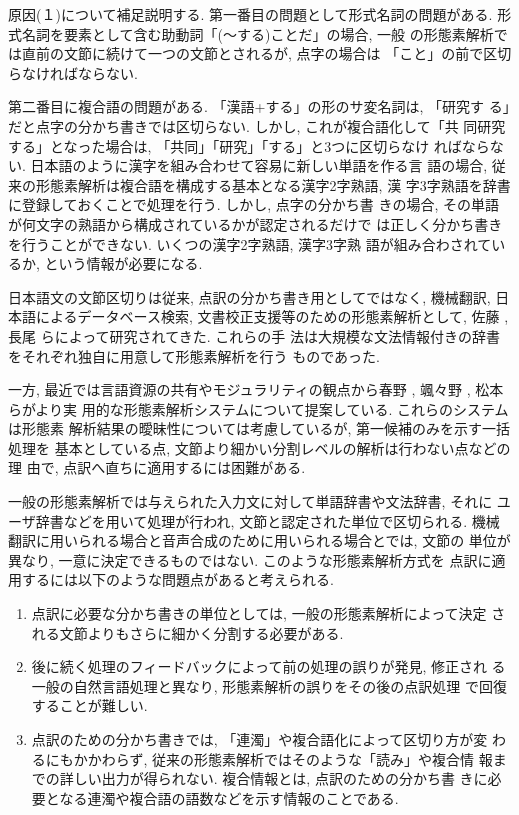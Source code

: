 原因(１)について補足説明する. 第一番目の問題として形式名詞の問題がある. 
形式名詞を要素として含む助動詞「(〜する)ことだ」の場合, 一般
 の形態素解析では直前の文節に続けて一つの文節とされるが, 点字の場合は
 「こと」の前で区切らなければならない. 

第二番目に複合語の問題がある. 「漢語+する」の形のサ変名詞は, 「研究す
る」だと点字の分かち書きでは区切らない. しかし, これが複合語化して「共
同研究する」となった場合は, 「共同」「研究」「する」と3つに区切らなけ
ればならない. 日本語のように漢字を組み合わせて容易に新しい単語を作る言
語の場合, 従来の形態素解析は複合語を構成する基本となる漢字2字熟語, 漢
字3字熟語を辞書に登録しておくことで処理を行う. しかし, 点字の分かち書
きの場合, その単語が何文字の熟語から構成されているかが認定されるだけで
は正しく分かち書きを行うことができない. いくつの漢字2字熟語, 漢字3字熟
語が組み合わされているか, という情報が必要になる. 

日本語文の文節区切りは従来, 点訳の分かち書き用としてではなく, 機械翻訳, 
日本語によるデータベース検索, 文書校正支援等のための形態素解析として, 
佐藤 \cite{satoh}, 長尾 \cite{nagao}らによって研究されてきた. これらの手
法は大規模な文法情報付きの辞書をそれぞれ独自に用意して形態素解析を行う
ものであった. 

一方, 最近では言語資源の共有やモジュラリティの観点から春野
\cite{haruno}, 颯々野 \cite{sassano}, 松本 \cite{matsumoto97}らがより実
用的な形態素解析システムについて提案している. これらのシステムは形態素
解析結果の曖昧性については考慮しているが, 第一候補のみを示す一括処理を
基本としている点, 文節より細かい分割レベルの解析は行わない点などの理
由で, 点訳へ直ちに適用するには困難がある. 

一般の形態素解析では与えられた入力文に対して単語辞書や文法辞書, それに
ユーザ辞書などを用いて処理が行われ, 文節と認定された単位で区切られる. 
機械翻訳に用いられる場合と音声合成のために用いられる場合とでは, 文節の
単位が異なり, 一意に決定できるものではない. このような形態素解析方式を
点訳に適用するには以下のような問題点があると考えられる. 

\vspace{0.3cm}

\begin{enumerate}
\item 点訳に必要な分かち書きの単位としては, 一般の形態素解析によって決定
      される文節よりもさらに細かく分割する必要がある. 
\item 後に続く処理のフィードバックによって前の処理の誤りが発見, 修正され
      る一般の自然言語処理と異なり, 形態素解析の誤りをその後の点訳処理
      で回復することが難しい. 
\item 点訳のための分かち書きでは, 「連濁」や複合語化によって区切り方が変
      わるにもかかわらず, 従来の形態素解析ではそのような「読み」や複合情
      報までの詳しい出力が得られない. 複合情報とは, 点訳のための分かち書
      きに必要となる連濁や複合語の語数などを示す情報のことである. 
\end{enumerate}


